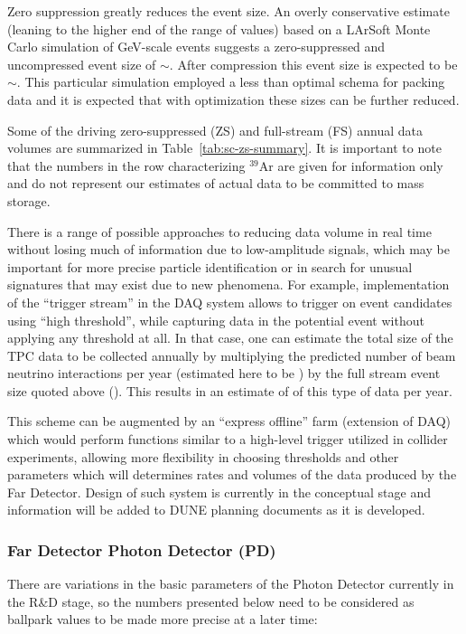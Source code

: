 Zero suppression greatly reduces the event size.  An overly
conservative estimate (leaning to the higher end of the range of
values) based on a LArSoft Monte Carlo simulation of GeV-scale events
suggests a zero-suppressed and uncompressed event size of
$\sim$\beameventsize.  After compression this event size is expected
to be $\sim$\beameventsizecompressed.  This particular simulation
employed a less than optimal schema for packing data and it is
expected that with optimization these sizes can be further reduced.


Some of the driving zero-suppressed (ZS) and full-stream (FS) annual
data volumes are summarized in Table~\ref{tab:sc-zs-summary}. It is
important to note that the numbers in the row characterizing $^{39}$Ar
are given for information only and do not represent our estimates of
actual data to be committed to mass storage.

There is a range of possible approaches to reducing data volume in
real time without losing much of information due to low-amplitude
signals, which may be important for more precise particle
identification or in search for unusual signatures that may exist due
to new phenomena. For example, implementation of the ``trigger
stream'' in the DAQ system allows to trigger on event candidates using
``high threshold'', while capturing data in the potential event
without applying any threshold at all. In that case, one can estimate
the total size of the TPC data to be collected annually by multiplying
the predicted number of beam neutrino interactions per year (estimated
here to be \beamrate) by the full stream event size quoted above
(\dunefsreadoutsize).  This results in an estimate of
\beamdatayearfs of this type of data per year.

This scheme can be augmented by an ``express offline'' farm (extension
of DAQ) which would perform functions similar to a high-level trigger
utilized in collider experiments, allowing more flexibility in
choosing thresholds and other parameters which will determines rates
and volumes of the data produced by the Far Detector. Design of such
system is currently in the conceptual stage and information will be
added to DUNE planning documents as it is developed.




\subsubsection{Far Detector Photon Detector (PD)}
There are variations in the basic parameters of the Photon Detector
currently in the R\&D stage, so the numbers presented below need to be
considered as ballpark values to be made more precise at a later time:

